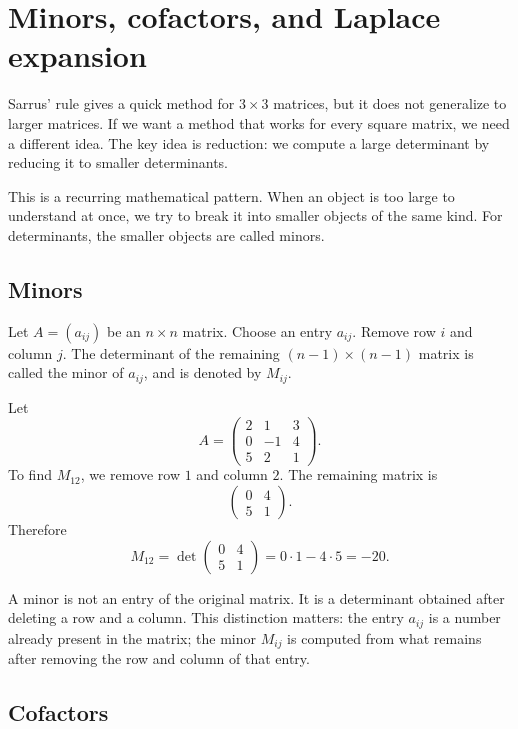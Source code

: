 \section{Minors, cofactors, and Laplace expansion}

Sarrus' rule gives a quick method for \(3\times3\) matrices, but it does not generalize to larger matrices. If we want a method that works for every square matrix, we need a different idea. The key idea is reduction: we compute a large determinant by reducing it to smaller determinants.

This is a recurring mathematical pattern. When an object is too large to understand at once, we try to break it into smaller objects of the same kind. For determinants, the smaller objects are called minors.

\subsection{Minors}

Let \(A=(a_{ij})\) be an \(n\times n\) matrix. Choose an entry \(a_{ij}\). Remove row \(i\) and column \(j\). The determinant of the remaining \((n-1)\times(n-1)\) matrix is called the minor of \(a_{ij}\), and is denoted by \(M_{ij}\).

\begin{examplebox}
Let
\[
A=\begin{pmatrix}
2&1&3\\
0&-1&4\\
5&2&1
\end{pmatrix}.
\]
To find \(M_{12}\), we remove row \(1\) and column \(2\). The remaining matrix is
\[
\begin{pmatrix}
0&4\\
5&1
\end{pmatrix}.
\]
Therefore
\[
M_{12}=\det\begin{pmatrix}0&4\\5&1\end{pmatrix}=0\cdot1-4\cdot5=-20.
\]
\end{examplebox}

A minor is not an entry of the original matrix. It is a determinant obtained after deleting a row and a column. This distinction matters: the entry \(a_{ij}\) is a number already present in the matrix; the minor \(M_{ij}\) is computed from what remains after removing the row and column of that entry.

\subsection{Cofactors}

